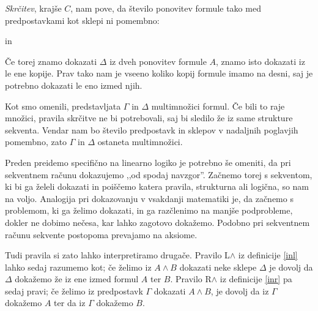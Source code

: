 \begin{definicija} \label{contraction}
    \emph{Skrčitev}, krajše $C$, nam pove, da število ponovitev formule tako med predpostavkami kot sklepi ni pomembno:
    \begin{center}
        \begin{bprooftree}
        \end{bprooftree} \qquad
        in \qquad
        \begin{bprooftree}
        \end{bprooftree}
    \end{center}
    Če torej znamo dokazati $\Delta$ iz dveh ponovitev formule $A$, znamo isto dokazati iz le ene kopije. Prav tako nam je vseeno koliko kopij formule imamo na desni, saj je potrebno dokazati le eno izmed njih.
\end{definicija}

\begin{opomba}
    Kot smo omenili, predstavljata $\Gamma$ in $\Delta$ multimnožici formul. Če bili to raje množici, pravila skrčitve ne bi potrebovali, saj bi sledilo že iz same strukture sekventa. Vendar nam bo število predpostavk in sklepov v nadaljnih poglavjih pomembno, zato $\Gamma$ in $\Delta$ ostaneta multimnožici.
\end{opomba}

Preden preidemo specifično na linearno logiko je potrebno še omeniti, da pri sekventnem računu dokazujemo ,,od spodaj navzgor''. Začnemo torej s sekventom, ki bi ga želeli dokazati in poiščemo katera pravila, strukturna ali logična, so nam na voljo. Analogija pri dokazovanju v vsakdanji matematiki je, da začnemo s problemom, ki ga želimo dokazati, in ga razčlenimo na manjše podprobleme, dokler ne dobimo nečesa, kar lahko zagotovo dokažemo. Podobno pri sekventnem računu sekvente postopoma prevajamo na aksiome.

Tudi pravila si zato lahko interpretiramo drugače. Pravilo L$\land$ iz definicije \ref{inl} lahko sedaj razumemo kot; če želimo iz $A \land B$ dokazati neke sklepe $\Delta$ je dovolj da $\Delta$ dokažemo že iz ene izmed formul $A$ ter $B$. Pravilo R$\land$ iz definicije \ref{inr} pa sedaj pravi; če želimo iz predpostavk $\Gamma$ dokazati $A \land B$, je dovolj da iz $\Gamma$ dokažemo $A$ ter da iz $\Gamma$ dokažemo $B$.

